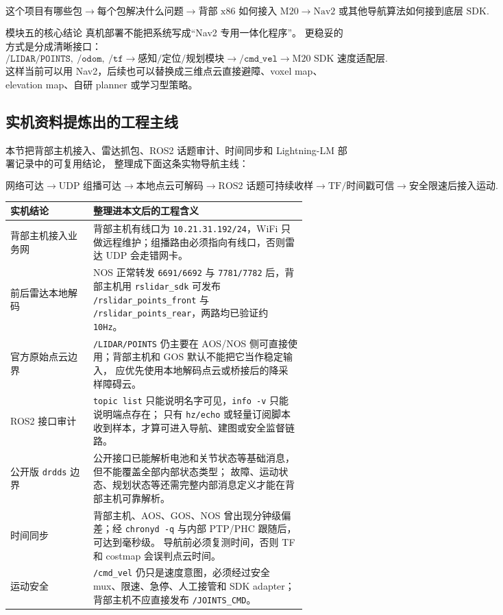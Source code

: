 \documentclass[UTF8,11pt,a4paper]{ctexart}
\begin{document}
\[
\text{这个项目有哪些包}
\rightarrow
\text{每个包解决什么问题}
\rightarrow
\text{背部 x86 如何接入 M20}
\rightarrow
\text{Nav2 或其他导航算法如何接到底层 SDK}.
\]

\begin{orangebox}{模块五的核心结论}
真机部署不能把系统写成“Nav2 专用一体化程序”。
更稳妥的方式是分成清晰接口：
\[
\texttt{/LIDAR/POINTS},\ \texttt{/odom},\ \texttt{/tf}
\rightarrow
\text{感知/定位/规划模块}
\rightarrow
\texttt{/cmd\_vel}
\rightarrow
\text{M20 SDK 速度适配层}.
\]
这样当前可以用 Nav2，后续也可以替换成三维点云直接避障、voxel map、elevation map、自研 planner 或学习型策略。
\end{orangebox}

\subsection{实机资料提炼出的工程主线}

本节把背部主机接入、雷达抓包、ROS2 话题审计、时间同步和 Lightning-LM 部署记录中的可复用结论，
整理成下面这条实物导航主线：

\[
\text{网络可达}
\rightarrow
\text{UDP 组播可达}
\rightarrow
\text{本地点云可解码}
\rightarrow
\text{ROS2 话题可持续收样}
\rightarrow
\text{TF/时间戳可信}
\rightarrow
\text{安全限速后接入运动}.
\]

\begin{center}
\renewcommand{\arraystretch}{1.22}
\begin{tabular}{p{0.24\linewidth}p{0.62\linewidth}}
\toprule
\textbf{实机结论} & \textbf{整理进本文后的工程含义}\\
\midrule
背部主机接入业务网 &
背部主机有线口为 \texttt{10.21.31.192/24}，WiFi 只做远程维护；组播路由必须指向有线口，否则雷达 UDP 会走错网卡。\\
前后雷达本地解码 &
NOS 正常转发 \texttt{6691/6692} 与 \texttt{7781/7782} 后，背部主机用 \texttt{rslidar\_sdk} 可发布
\texttt{/rslidar\_points\_front} 与 \texttt{/rslidar\_points\_rear}，两路均已验证约 \texttt{10Hz}。\\
官方原始点云边界 &
\texttt{/LIDAR/POINTS} 仍主要在 AOS/NOS 侧可直接使用；背部主机和 GOS 默认不能把它当作稳定输入，
应优先使用本地解码点云或桥接后的降采样障碍云。\\
ROS2 接口审计 &
\texttt{topic list} 只能说明名字可见，\texttt{info -v} 只能说明端点存在；
只有 \texttt{hz/echo} 或轻量订阅脚本收到样本，才算可进入导航、建图或安全监督链路。\\
公开版 \texttt{drdds} 边界 &
公开接口已能解析电池和关节状态等基础消息，但不能覆盖全部内部状态类型；
故障、运动状态、规划状态等还需完整内部消息定义才能在背部主机可靠解析。\\
时间同步 &
背部主机、AOS、GOS、NOS 曾出现分钟级偏差；经 \texttt{chronyd -q} 与内部 PTP/PHC 跟随后，可达到毫秒级。
导航前必须复测时间，否则 TF 和 costmap 会误判点云时间。\\
运动安全 &
\texttt{/cmd\_vel} 仍只是速度意图，必须经过安全 mux、限速、急停、人工接管和 SDK adapter；
背部主机不应直接发布 \texttt{/JOINTS\_CMD}。\\
\bottomrule
\end{tabular}
\end{center}
\end{document}
